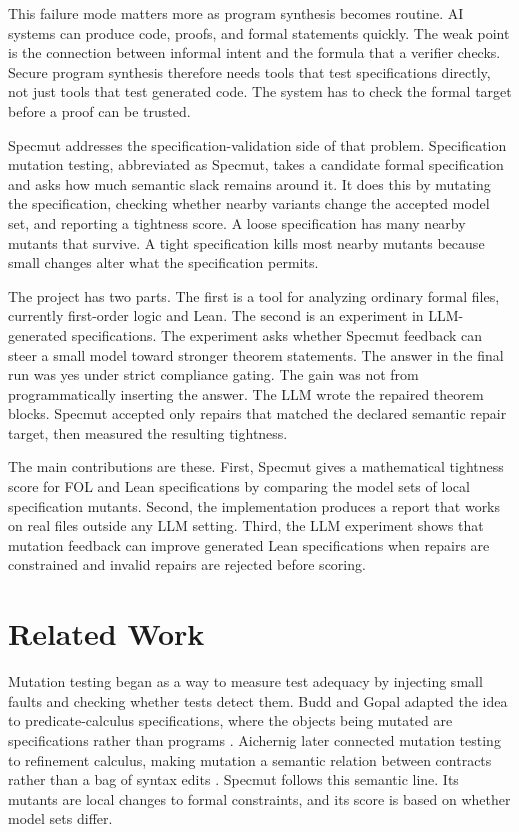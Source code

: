 \documentclass[11pt]{article}
\begin{document}
This failure mode matters more as program synthesis becomes routine. AI systems can produce code, proofs, and formal statements quickly. The weak point is the connection between informal intent and the formula that a verifier checks. Secure program synthesis therefore needs tools that test specifications directly, not just tools that test generated code. The system has to check the formal target before a proof can be trusted.

Specmut addresses the specification-validation side of that problem. Specification mutation testing, abbreviated as Specmut, takes a candidate formal specification and asks how much semantic slack remains around it. It does this by mutating the specification, checking whether nearby variants change the accepted model set, and reporting a tightness score. A loose specification has many nearby mutants that survive. A tight specification kills most nearby mutants because small changes alter what the specification permits.

The project has two parts. The first is a tool for analyzing ordinary formal files, currently first-order logic and Lean. The second is an experiment in LLM-generated specifications. The experiment asks whether Specmut feedback can steer a small model toward stronger theorem statements. The answer in the final run was yes under strict compliance gating. The gain was not from programmatically inserting the answer. The LLM wrote the repaired theorem blocks. Specmut accepted only repairs that matched the declared semantic repair target, then measured the resulting tightness.

The main contributions are these. First, Specmut gives a mathematical tightness score for FOL and Lean specifications by comparing the model sets of local specification mutants. Second, the implementation produces a report that works on real files outside any LLM setting. Third, the LLM experiment shows that mutation feedback can improve generated Lean specifications when repairs are constrained and invalid repairs are rejected before scoring.

\section{Related Work}

Mutation testing began as a way to measure test adequacy by injecting small faults and checking whether tests detect them. Budd and Gopal adapted the idea to predicate-calculus specifications, where the objects being mutated are specifications rather than programs \cite{budd1985}. Aichernig later connected mutation testing to refinement calculus, making mutation a semantic relation between contracts rather than a bag of syntax edits \cite{aichernig2003}. Specmut follows this semantic line. Its mutants are local changes to formal constraints, and its score is based on whether model sets differ.
\end{document}
